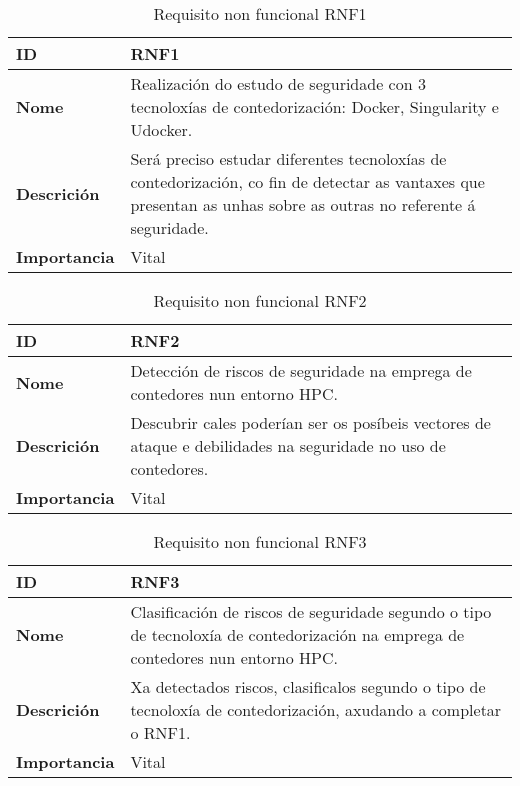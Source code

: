 \begin{table}[H]
\centering
\caption{Requisito non funcional RNF1}
\label{RNF1}
\begin{tabularx}{\textwidth}{|l|X|}
\hline
\textbf{ID} & RNF1 \\ \hline
\textbf{Nome} & Realización do estudo de seguridade con 3 tecnoloxías de contedorización: Docker, Singularity e Udocker. \\ \hline
\textbf{Descrición} & Será preciso estudar diferentes tecnoloxías de contedorización, co fin de detectar as vantaxes que presentan as unhas sobre as outras no referente á seguridade. \\ \hline
\textbf{Importancia} & Vital \\ \hline
\end{tabularx}
\end{table}

\begin{table}[H]
\centering
\caption{Requisito non funcional RNF2}
\label{RNF2}
\begin{tabularx}{\textwidth}{|l|X|}
\hline
\textbf{ID} & RNF2 \\ \hline
\textbf{Nome} & Detección de riscos de seguridade na emprega de contedores nun entorno \gls{HPC}. \\ \hline
\textbf{Descrición} & Descubrir cales poderían ser os posíbeis vectores de ataque e debilidades na seguridade no uso de contedores. \\ \hline
\textbf{Importancia} & Vital \\ \hline
\end{tabularx}
\end{table}

\begin{table}[H]
\centering
\caption{Requisito non funcional RNF3}
\label{RNF3}
\begin{tabularx}{\textwidth}{|l|X|}
\hline
\textbf{ID} & RNF3 \\ \hline
\textbf{Nome} & Clasificación de riscos de seguridade segundo o tipo de tecnoloxía de contedorización na emprega de contedores nun entorno \gls{HPC}. \\ \hline
\textbf{Descrición} & Xa detectados riscos, clasificalos segundo o tipo de tecnoloxía de contedorización, axudando a completar o RNF1. \\ \hline
\textbf{Importancia} & Vital \\ \hline
\end{tabularx}
\end{table}

